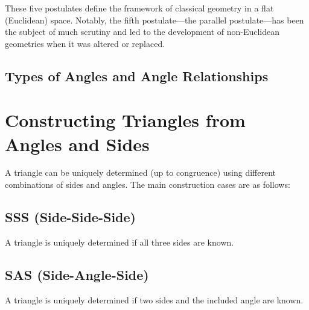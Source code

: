 These five postulates define the framework of classical geometry in a flat (Euclidean) space. Notably, the fifth postulate—the parallel postulate—has been the subject of much scrutiny and led to the development of non-Euclidean geometries when it was altered or replaced.

\subsection{Types of Angles and Angle Relationships}





\section{Constructing Triangles from Angles and Sides}
A triangle can be uniquely determined (up to congruence) using different combinations of sides and angles. The main construction cases are as follows:

\subsection{SSS (Side-Side-Side)}
A triangle is uniquely determined if all three sides are known.
\begin{center}
\end{center}

\subsection{SAS (Side-Angle-Side)}
A triangle is uniquely determined if two sides and the included angle are known.
\begin{center}
\end{center}

